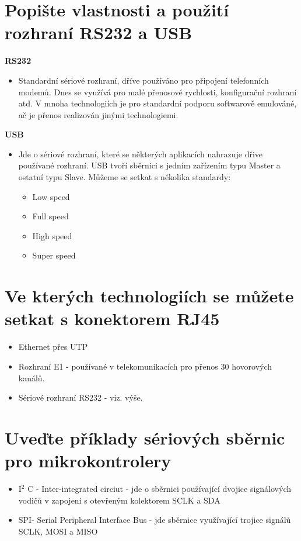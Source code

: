 \section{Popište vlastnosti a použití rozhraní RS232 a USB}
\textbf{RS232}
\begin{itemize}
    \item Standardní sériové rozhraní, dříve používáno pro připojení telefonních modemů.
    Dnes se využívá pro malé přenosové rychlosti, konfigurační rozhraní atd.
    V mnoha technologiích je pro standardní podporu softwarově emulováné, ač je přenos realizován jinými technologiemi.
\end{itemize}
\textbf{USB}
\begin{itemize}
    \item Jde o sériové rozhraní, které se některých aplikacích nahrazuje dřive používané rozhraní.
    USB tvoří sběrnici s jedním zařízením typu Master a ostatní typu Slave.
    Můžeme se setkat s několika standardy:
\begin{itemize}
    \item Low speed
    \item Full speed
    \item High speed
    \item Super speed
\end{itemize}
\end{itemize}
\section{Ve kterých technologiích se můžete setkat s konektorem RJ45}
\begin{itemize}
    \item Ethernet přes UTP
    \item Rozhraní E1 - používané v telekomunikacích pro přenos 30 hovorových kanálů.
    \item Sériové rozhraní RS232 - viz. výše.
\end{itemize}
\section{Uveďte příklady sériových sběrnic pro mikrokontrolery}
\begin{itemize}
    \item I$^2$ C - Inter-integrated circiut - jde o sběrnici používající dvojice signálových vodičů v zapojení s otevřeným kolektorem SCLK a SDA
    \item SPI- Serial Peripheral Interface Bus - jde sběrnice využívající trojice signálů SCLK, MOSI a MISO
\end{itemize}
